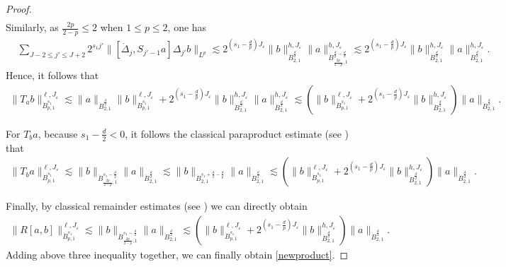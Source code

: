 \documentclass[10pt,a4paper]{amsart}
\def\dB{{\dot {B}}}
\def\ddj{\dot \Delta_j}
\begin{document}
\begin{proof}
\begin{equation}
\begin{aligned}
\end{aligned}
\end{equation}
Similarly, as $\frac{2p}{2-p}\leq 2$ when $1\leq p\leq 2$, one has
\begin{equation}\nonumber
\begin{aligned}
&\sum\limits_{J -2 \leq j'\leq J+2}2^{s_1j'}
\|[\ddj, S_{j'-1} a] \Delta_{j'} b\|_{L^p}
\lesssim
2^{(s_1-\frac{d}{p})J_\varepsilon}
\|b\|_{\dB_{2,1}^{\frac{d}{2}}}^{h,J_\varepsilon} \|a\|_{\dB_{\frac{2p}{2-p},1}^{\frac{d}{p}-\frac{d}{2}}}^{h,J_\varepsilon}\lesssim 2^{(s_1-\frac{d}{p})J_\varepsilon}
\|b\|_{\dB_{2,1}^{\frac{d}{2}}}^{h,J_\varepsilon} \|a\|_{\dB_{2,1}^{\frac{d}{2}}}^{h,J_\varepsilon}.
\end{aligned}
\end{equation}
Hence, it follows that
\begin{equation}\nonumber
\begin{aligned}
\|T_{a} b\|_{\dB_{p,1}^{s_1}}^{\ell,J_\varepsilon} \lesssim \|a\|_{\dB_{2,1}^{\frac{d}{2}}}\|b\|_{\dB_{p,1}^{s_1}}^{\ell,J_\varepsilon}
+2^{(s_1-\frac{d}{p})J_\varepsilon}\|b\|_{\dB_{2,1}^{\frac{d}{2}}}^{h,J_\varepsilon} \|a\|_{\dB_{2,1}^{\frac{d}{2}}}^{h,J_\varepsilon}
\lesssim
\left(\|b\|_{\dB_{p,1}^{s_1}}^{\ell,J_\varepsilon}+ 2^{(s_1-\frac{d}{p})J_\varepsilon}\|b\|_{\dB_{2,1}^{\frac{d}{2}}}^{h,J_\varepsilon} \right)\|a\|_{\dB_{2,1}^{\frac{d}{2}}}.
\end{aligned}
\end{equation}

For $T_{b} a$, because $s_1-\frac{d}{2}<0$, it follows the classical paraproduct estimate (see \cite{Danchin}) that
\begin{equation}\nonumber
\begin{aligned}
\|T_{b} a\|_{\dB_{p,1}^{s_1}}^{\ell,J_\varepsilon}
\lesssim
\|b\|_{\dB_{\frac{2p}{2-p},1}^{s_1-\frac{d}{2}}}\|a\|_{\dB_{2,1}^{\frac{d}{2}}}
\lesssim
\|b\|_{\dB_{2,1}^{s_1+\frac{d}{2}-\frac{d}{p}}}\|a\|_{\dB_{2,1}^{\frac{d}{2}}}
\lesssim
\left(\|b\|_{\dB_{p,1}^{s_1}}^{\ell,J_\varepsilon}+ 2^{(s_1-\frac{d}{p})J_\varepsilon}\|b\|_{\dB_{2,1}^{\frac{d}{2}}}^{h,J_\varepsilon} \right)\|a\|_{\dB_{2,1}^{\frac{d}{2}}}.
\end{aligned}
\end{equation}

Finally, by classical remainder estimates (see \cite[Theorem 2.85]{chemin}) we can directly obtain
\begin{equation}\nonumber
\begin{aligned}
\|R[a,b]\|_{\dB_{p,1}^{s_1}}^{\ell,J_\varepsilon}
\lesssim
\|b\|_{\dB_{\frac{2p}{2-p},1}^{s_1-\frac{d}{2}}}\|a\|_{\dB_{2,1}^{\frac{d}{2}}}
\lesssim
\left(\|b\|_{\dB_{p,1}^{s_1}}^{\ell,J_\varepsilon}+ 2^{(s_1-\frac{d}{p})J_\varepsilon}\|b\|_{\dB_{2,1}^{\frac{d}{2}}}^{h,J_\varepsilon} \right)\|a\|_{\dB_{2,1}^{\frac{d}{2}}}.
\end{aligned}
\end{equation}
Adding above three inequality together, we can finally obtain \eqref{newproduct}.
\end{proof}
\end{document}

